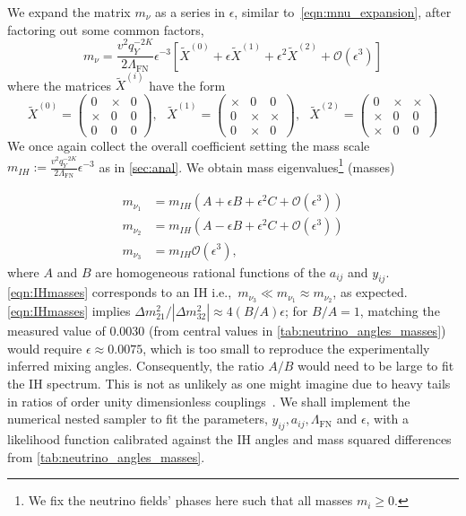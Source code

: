 \documentclass[11pt,letterpaper]{article}
\begin{document}
We expand the matrix $m_\nu$ as a series in $\epsilon$, similar to~\cref{eqn:mnu_expansion}, after factoring out some common factors, 
\begin{equation}
    m_\nu = \frac{v^2 q_Y^{-2K}}{2\Lambda_{\text{FN}}} \epsilon^{-3} \left[\tilde X^{(0)} + \epsilon \tilde
    X^{(1)} + \epsilon^2 \tilde X^{(2)} + \mathcal{O}(\epsilon^3)\right] 
\end{equation}
where the matrices $\tilde X^{(i)}$ have the form
\begin{equation}
    \tilde X^{(0)} = \begin{pmatrix}
        0 &  \times & 0 \\
        \times  & 0  &  0  \\
        0  & 0  & 0
    \end{pmatrix}, \,\,\,\,  \tilde X^{(1)} = \begin{pmatrix}
        \times & 0 & 0 \\
        0 &  \times &\times  \\
        0  & \times & 0
    \end{pmatrix}, \,\,\,\, 
    \tilde X^{(2)} = \begin{pmatrix}
    0 & \times & \times \\
    \times & 0& 0  \\
    \times& 0&0 
    \end{pmatrix}
\end{equation}
We once again collect the overall coefficient setting the mass scale $m_{IH} := \frac{v^2 q_Y^{-2K}}{2\Lambda_{\text{FN}}}\epsilon^{-3}$ as in \cref{sec:anal}. We obtain
mass eigenvalues\footnote{We fix the neutrino fields' phases here such that all masses $m_{i} \geq 0$.} (masses) 

\begin{align} 
    m_{\nu_1} &= m_{IH} \left(A + \epsilon B+ \epsilon^2
    C+{\mathcal{O}}(\epsilon^3) \right) \nonumber \\
    m_{\nu_2} &= m_{IH} \left(A - \epsilon B+  \epsilon^2
    C+{\mathcal{O}}(\epsilon^3) \right)\label{eqn:IHmasses} \\
    m_{\nu_3} &= m_{IH} {\mathcal{O}}(\epsilon^3), \nonumber 
\end{align}
where $A$ and $B$ are
homogeneous rational functions of the $a_{ij}$ and $y_{ij}$.
\cref{eqn:IHmasses} corresponds to an IH i.e.,\ $m_{\nu_3} \ll m_{\nu_1}
\approx m_{\nu_2}$, as
expected. 
\cref{eqn:IHmasses} implies
$\Delta m_{21}^2 / |\Delta m_{32}^2| \approx 4 (B/A) \epsilon$; for $B/A=1$,
matching the measured value of $0.0030$
(from central values in \cref{tab:neutrino_angles_masses}) would require
$\epsilon \approx 0.0075$, which is too small
to reproduce the experimentally inferred
mixing angles. Consequently, the ratio $A/B$ would need to be large to fit the
IH spectrum. This is not as
unlikely as one might imagine due to heavy tails in
ratios of order unity dimensionless couplings~\cite{Allanach:2026rkb}. We
shall implement the numerical nested sampler to fit 
the parameters, $y_{ij},a_{ij},\Lambda_{\text{FN}}$ and $\epsilon$, with a
likelihood function calibrated against the IH angles and mass squared
differences from \cref{tab:neutrino_angles_masses}.
\end{document}
